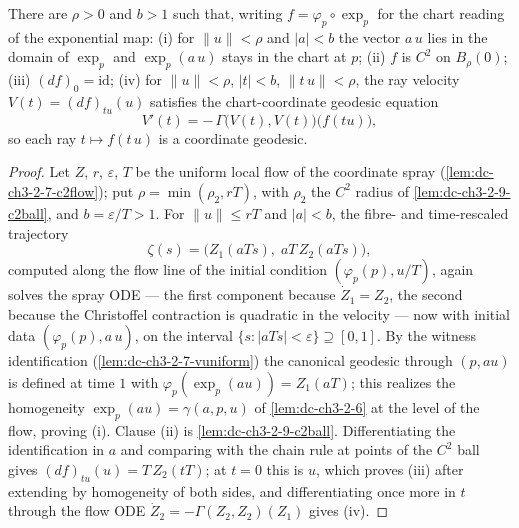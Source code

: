 \begin{lemma}
  \label{lem:dc-ch3-3-5-rayode}


  There are $\rho > 0$ and $b > 1$ such that, writing
  $f = \varphi_p \circ \exp_p$ for the chart reading of the exponential map:
  (i) for $\|u\| < \rho$ and $|a| < b$ the vector $a\,u$ lies in the domain of
  $\exp_p$ and $\exp_p(a\,u)$ stays in the chart at $p$;
  (ii) $f$ is $C^2$ on $B_\rho(0)$;
  (iii) $(df)_0 = \mathrm{id}$;
  (iv) for $\|u\| < \rho$, $|t| < b$, $\|t\,u\| < \rho$, the ray velocity
  $V(t) = (df)_{tu}(u)$ satisfies the chart-coordinate geodesic equation
  $$V'(t) = -\,\Gamma\big(V(t), V(t)\big)\big(f(tu)\big),$$
  so each ray $t \mapsto f(t\,u)$ is a coordinate geodesic.
\end{lemma}
\begin{proof}
  \sketch

  Let $Z$, $r$, $\varepsilon$, $T$ be the uniform local flow of the coordinate
  spray (\cref{lem:dc-ch3-2-7-c2flow}); put
  $\rho = \min(\rho_2, rT)$, with $\rho_2$ the $C^2$ radius of
  \cref{lem:dc-ch3-2-9-c2ball}, and $b = \varepsilon/T > 1$. For
  $\|u\| \le rT$ and $|a| < b$, the fibre- and time-rescaled trajectory
  $$\zeta(s) = \big(Z_1(aTs),\; aT\,Z_2(aTs)\big),$$
  computed along the flow line of the initial condition
  $(\varphi_p(p), u/T)$, again solves the spray ODE — the first component
  because $\dot Z_1 = Z_2$, the second because the Christoffel contraction is
  quadratic in the velocity — now with initial data $(\varphi_p(p), a\,u)$,
  on the interval $\{s : |aTs| < \varepsilon\} \supseteq [0,1]$. By the
  witness identification (\cref{lem:dc-ch3-2-7-vuniform}) the canonical
  geodesic through $(p, a u)$ is defined at time $1$ with
  $\varphi_p(\exp_p(a u)) = Z_1(aT)$; this realizes the homogeneity
  $\exp_p(a u) = \gamma(a, p, u)$ of \cref{lem:dc-ch3-2-6} at the level of
  the flow, proving (i). Clause (ii) is \cref{lem:dc-ch3-2-9-c2ball}.
  Differentiating the identification in $a$ and comparing with the chain
  rule at points of the $C^2$ ball gives $(df)_{tu}(u) = T\,Z_2(tT)$; at
  $t = 0$ this is $u$, which proves (iii) after extending by homogeneity of
  both sides, and differentiating once more in $t$ through the flow ODE
  $\dot Z_2 = -\Gamma(Z_2, Z_2)(Z_1)$ gives (iv).
\end{proof}

